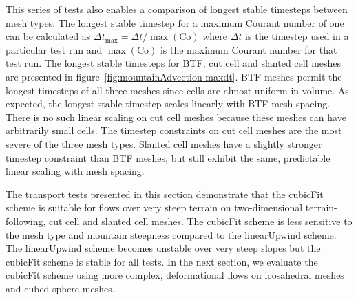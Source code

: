 This series of tests also enables a comparison of longest stable timesteps between mesh types.  The longest stable timestep for a maximum Courant number of one can be calculated as $\Delta t_\mathrm{max} = \Delta t / \max(\mathrm{Co})$ where $\Delta t$ is the timestep used in a particular test run and $\max(\mathrm{Co})$ is the maximum Courant number for that test run.
The longest stable timesteps for BTF, cut cell and slanted cell meshes are presented in figure~\ref{fig:mountainAdvection-maxdt}.  BTF meshes permit the longest timesteps of all three meshes since cells are almost uniform in volume.  As expected, the longest stable timestep scales linearly with BTF mesh spacing.
There is no such linear scaling on cut cell meshes because these meshes can have arbitrarily small cells.  The timestep constraints on cut cell meshes are the most severe of the three mesh types.  Slanted cell meshes have a slightly stronger timestep constraint than BTF meshes, but still exhibit the same, predictable linear scaling with mesh spacing.

The transport tests presented in this section demonstrate that the cubicFit scheme is suitable for flows over very steep terrain on two-dimensional terrain-following, cut cell and slanted cell meshes.  The cubicFit scheme is less sensitive to the mesh type and mountain steepness compared to the linearUpwind scheme.  The linearUpwind scheme becomes unstable over very steep slopes but the cubicFit scheme is stable for all tests.  In the next section, we evaluate the cubicFit scheme using more complex, deformational flows on icosahedral meshes and cubed-sphere meshes.
